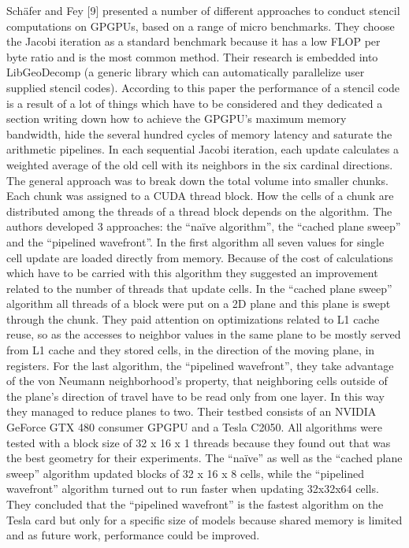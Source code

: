 Schäfer and Fey [9] presented a number of different approaches to conduct stencil computations on GPGPUs, based on a range of micro benchmarks. They choose the Jacobi iteration as a standard benchmark because it has a low FLOP per byte ratio and is the most common method. Their research is embedded into LibGeoDecomp (a generic library which can automatically parallelize user supplied stencil codes). According to this paper the performance of a stencil code is a result of a lot of things which have to be considered and they dedicated a section writing down how to achieve the GPGPU's maximum memory bandwidth, hide the several hundred cycles of memory latency and saturate the arithmetic pipelines. In each sequential Jacobi iteration, each update calculates a weighted average of the old cell with its neighbors in the six cardinal directions. The general approach was to break down the total volume into smaller chunks. Each chunk was assigned to a CUDA thread block. How the cells of a chunk are distributed among the threads of a thread block depends on the algorithm. The authors developed 3 approaches: the “naïve algorithm”, the “cached plane sweep” and the “pipelined wavefront”. In the first algorithm all seven values for single cell update are loaded directly from memory. Because of the cost of calculations which have to be carried with this algorithm they suggested an improvement related to the number of threads that update cells. In the “cached plane sweep” algorithm all threads of a block were put on a 2D plane and this plane is swept through the chunk. They paid attention on optimizations related to L1 cache reuse, so as the accesses to neighbor values in the same plane to be mostly served from L1 cache and they stored cells, in the direction of the moving plane, in registers. For the last algorithm, the “pipelined wavefront”, they take advantage of the von Neumann neighborhood’s property, that neighboring cells outside of the plane’s direction of travel have to be read only from one layer. In this way they managed to reduce planes to two. Their testbed consists of an NVIDIA GeForce GTX 480 consumer GPGPU and a Tesla C2050. All algorithms were tested with a block size of 32 x 16 x 1 threads because they found out that was the best geometry for their experiments. The “naïve” as well as the “cached plane sweep” algorithm updated blocks of 32 x 16 x 8 cells, while the “pipelined wavefront” algorithm turned out to run faster when updating 32x32x64 cells. They concluded that the “pipelined wavefront” is the fastest algorithm on the Tesla card but only for a specific size of models because shared memory is limited and as future work, performance could be improved.  

